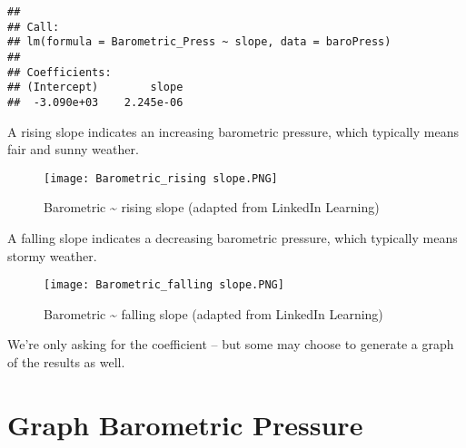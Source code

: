 \documentclass[
  11pt,
]{article}
\begin{document}
\begin{verbatim}
## 
## Call:
## lm(formula = Barometric_Press ~ slope, data = baroPress)
## 
## Coefficients:
## (Intercept)        slope  
##  -3.090e+03    2.245e-06
\end{verbatim}

A rising slope indicates an increasing barometric pressure, which
typically means fair and sunny weather.

\begin{figure}
\centering
\texttt{[image: Barometric\_rising slope.PNG]}
\caption{Barometric \textasciitilde{} rising slope (adapted from
LinkedIn Learning)}
\end{figure}

A falling slope indicates a decreasing barometric pressure, which
typically means stormy weather.

\begin{figure}
\centering
\texttt{[image: Barometric\_falling slope.PNG]}
\caption{Barometric \textasciitilde{} falling slope (adapted from
LinkedIn Learning)}
\end{figure}

We're only asking for the coefficient -- but some may choose to generate
a graph of the results as well.

\hypertarget{graph-barometric-pressure}{%
\section{Graph Barometric Pressure}\label{graph-barometric-pressure}}
\end{document}
